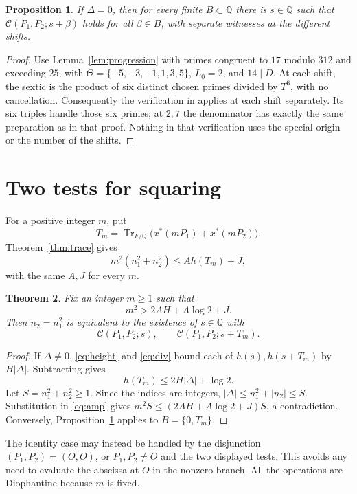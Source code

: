 \documentclass[11pt,a4paper]{article}
\newtheorem{theorem}{Theorem}[section]
\newtheorem{proposition}[theorem]{Proposition}
\newcommand{\Q}{\mathbb Q}\newcommand{\Z}{\mathbb Z}
\DeclareMathOperator{\Tr}{Tr}\DeclareMathOperator{\Num}{Num}
\begin{document}
\begin{proposition}\label{prop:finite}
If $\Delta=0$, then for every finite $B\subset\Q$ there is
$s\in\Q$ such that $\mathcal C(P_1,P_2;s+\beta)$ holds for all
$\beta\in B$, with separate witnesses at the different shifts.
\end{proposition}
\begin{proof}
Use Lemma~\ref{lem:progression} with primes congruent to $17$ modulo
$312$ and exceeding $25$, with $\Theta=\{-5,-3,-1,1,3,5\}$,
$L_0=2$, and $14\mid D$. At each shift, the sextic is the product
of six distinct chosen primes divided by $T^6$, with no cancellation.
Consequently the verification in \cite[Lemma 5.6]{BB} applies at
each shift separately. Its six triples handle those six primes; at
$2,7$ the denominator has exactly the same preparation as in that
proof. Nothing in that verification uses the special origin or the
number of the shifts.
\end{proof}

\section{Two tests for squaring}
For a positive integer $m$, put
\[
 T_m=\Tr_{F/\Q}\bigl(x^*(mP_1)+x^*(mP_2)\bigr).
\]
Theorem~\ref{thm:trace} gives
\begin{equation}\label{eq:amp}
 m^2(n_1^2+n_2^2)\le A h(T_m)+J,
\end{equation}
with the same $A,J$ for every $m$.

\begin{theorem}\label{thm:two}
Fix an integer $m\ge1$ such that
\[
 m^2>2AH+A\log 2+J.
\]
Then $n_2=n_1^2$ is equivalent to the existence of $s\in\Q$ with
\[
 \mathcal C(P_1,P_2;s),\qquad
 \mathcal C(P_1,P_2;s+T_m).
\]
\end{theorem}
\begin{proof}
If $\Delta\ne0$, \eqref{eq:height} and \eqref{eq:div} bound each
of $h(s),h(s+T_m)$ by $H|\Delta|$. Subtracting gives
\[
 h(T_m)\le2H|\Delta|+\log2.
\]
Let $S=n_1^2+n_2^2\ge1$. Since the indices are integers,
$|\Delta|\le n_1^2+|n_2|\le S$. Substitution in
\eqref{eq:amp} gives
$m^2S\le(2AH+A\log2+J)S$, a contradiction. Conversely,
Proposition~\ref{prop:finite} applies to $B=\{0,T_m\}$.
\end{proof}

The identity case may instead be handled by the disjunction
$(P_1,P_2)=(O,O)$, or $P_1,P_2\ne O$ and the two displayed tests.
This avoids any need to evaluate the abscissa at $O$ in the nonzero
branch. All the operations are Diophantine because $m$ is fixed.
\end{document}
